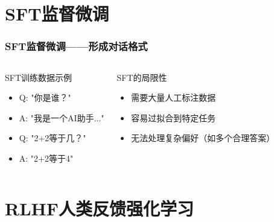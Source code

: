 \documentclass[8pt,aspectratio=169]{beamer}
\begin{document}
\section{SFT监督微调}
\begin{frame}
    \frametitle{SFT监督微调——形成对话格式}
    
    \begin{columns}[T]
        \begin{exampleblock}{SFT训练数据示例}
            \begin{itemize}
                \item Q: "你是谁？"
                \item A: "我是一个AI助手..."
                \item Q: "2+2等于几？"
                \item A: "2+2等于4"
            \end{itemize}
        \end{exampleblock}
        
        \begin{alertblock}{SFT的局限性}
            \begin{itemize}
                \item 需要大量人工标注数据
                \item 容易过拟合到特定任务
                \item 无法处理复杂偏好（如多个合理答案）
            \end{itemize}
        \end{alertblock}
        
    \end{columns}
\end{frame}

\section{RLHF人类反馈强化学习}
\end{document}
